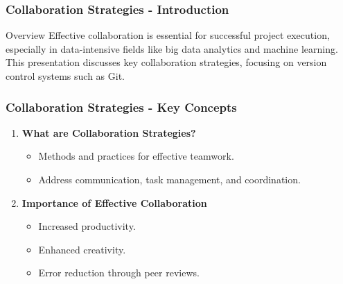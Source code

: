 \documentclass[aspectratio=169]{beamer}
\begin{document}
\begin{frame}[fragile]
    \frametitle{Collaboration Strategies - Introduction}
    \begin{block}{Overview}
        Effective collaboration is essential for successful project execution, especially in data-intensive fields like big data analytics and machine learning. This presentation discusses key collaboration strategies, focusing on version control systems such as Git.
    \end{block}
\end{frame}

\begin{frame}[fragile]
    \frametitle{Collaboration Strategies - Key Concepts}
    \begin{enumerate}
        \item \textbf{What are Collaboration Strategies?}
          \begin{itemize}
            \item Methods and practices for effective teamwork.
            \item Address communication, task management, and coordination.
          \end{itemize}
        \item \textbf{Importance of Effective Collaboration}
          \begin{itemize}
            \item Increased productivity.
            \item Enhanced creativity.
            \item Error reduction through peer reviews.
          \end{itemize}
    \end{enumerate}
\end{frame}
\end{document}
